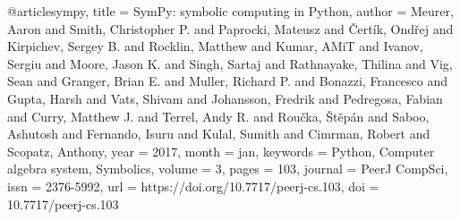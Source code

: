 
@article{sympy,
 title = {SymPy: symbolic computing in Python},
 author = {Meurer, Aaron and Smith, Christopher P. and Paprocki, Mateusz and \v{C}ert\'{i}k, Ond\v{r}ej and Kirpichev, Sergey B. and Rocklin, Matthew and Kumar, AMiT and Ivanov, Sergiu and Moore, Jason K. and Singh, Sartaj and Rathnayake, Thilina and Vig, Sean and Granger, Brian E. and Muller, Richard P. and Bonazzi, Francesco and Gupta, Harsh and Vats, Shivam and Johansson, Fredrik and Pedregosa, Fabian and Curry, Matthew J. and Terrel, Andy R. and Rou\v{c}ka, \v{S}t\v{e}p\'{a}n and Saboo, Ashutosh and Fernando, Isuru and Kulal, Sumith and Cimrman, Robert and Scopatz, Anthony},
 year = 2017,
 month = jan,
 keywords = {Python, Computer algebra system, Symbolics},
 volume = 3,
 pages = {103},
 journal = {PeerJ CompSci},
 issn = {2376-5992},
 url = {https://doi.org/10.7717/peerj-cs.103},
 doi = {10.7717/peerj-cs.103}
}
